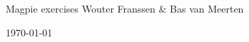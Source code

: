 %
%
%
%

\begin{titlepage}
\begin{center}




{\Huge Magpie exercises}
\vfill
\large Wouter Franssen \& Bas van Meerten

\vfill


\vfill
\vfill
{\large \today}

\end{center}

\end{titlepage}
